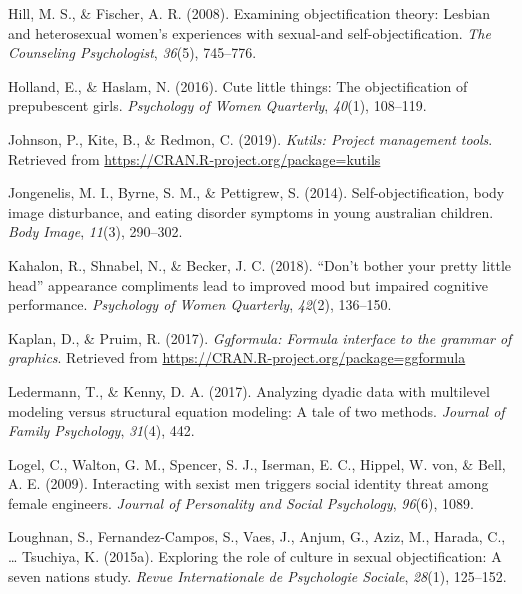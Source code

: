 \documentclass[
  man]{apa6}
\begin{document}
\leavevmode\hypertarget{ref-hill2008examining}{}%
Hill, M. S., \& Fischer, A. R. (2008). Examining objectification theory: Lesbian and heterosexual women's experiences with sexual-and self-objectification. \emph{The Counseling Psychologist}, \emph{36}(5), 745--776.

\leavevmode\hypertarget{ref-holland2016}{}%
Holland, E., \& Haslam, N. (2016). Cute little things: The objectification of prepubescent girls. \emph{Psychology of Women Quarterly}, \emph{40}(1), 108--119.

\leavevmode\hypertarget{ref-R-kutils}{}%
Johnson, P., Kite, B., \& Redmon, C. (2019). \emph{Kutils: Project management tools}. Retrieved from \url{https://CRAN.R-project.org/package=kutils}

\leavevmode\hypertarget{ref-jongenelis2014}{}%
Jongenelis, M. I., Byrne, S. M., \& Pettigrew, S. (2014). Self-objectification, body image disturbance, and eating disorder symptoms in young australian children. \emph{Body Image}, \emph{11}(3), 290--302.

\leavevmode\hypertarget{ref-kahalon2018don}{}%
Kahalon, R., Shnabel, N., \& Becker, J. C. (2018). ``Don't bother your pretty little head'' appearance compliments lead to improved mood but impaired cognitive performance. \emph{Psychology of Women Quarterly}, \emph{42}(2), 136--150.

\leavevmode\hypertarget{ref-R-ggformula}{}%
Kaplan, D., \& Pruim, R. (2017). \emph{Ggformula: Formula interface to the grammar of graphics}. Retrieved from \url{https://CRAN.R-project.org/package=ggformula}

\leavevmode\hypertarget{ref-ledermann2017analyzing}{}%
Ledermann, T., \& Kenny, D. A. (2017). Analyzing dyadic data with multilevel modeling versus structural equation modeling: A tale of two methods. \emph{Journal of Family Psychology}, \emph{31}(4), 442.

\leavevmode\hypertarget{ref-logel2009interacting}{}%
Logel, C., Walton, G. M., Spencer, S. J., Iserman, E. C., Hippel, W. von, \& Bell, A. E. (2009). Interacting with sexist men triggers social identity threat among female engineers. \emph{Journal of Personality and Social Psychology}, \emph{96}(6), 1089.

\leavevmode\hypertarget{ref-loughnan2015exploring}{}%
Loughnan, S., Fernandez-Campos, S., Vaes, J., Anjum, G., Aziz, M., Harada, C., \ldots{} Tsuchiya, K. (2015a). Exploring the role of culture in sexual objectification: A seven nations study. \emph{Revue Internationale de Psychologie Sociale}, \emph{28}(1), 125--152.
\end{document}
